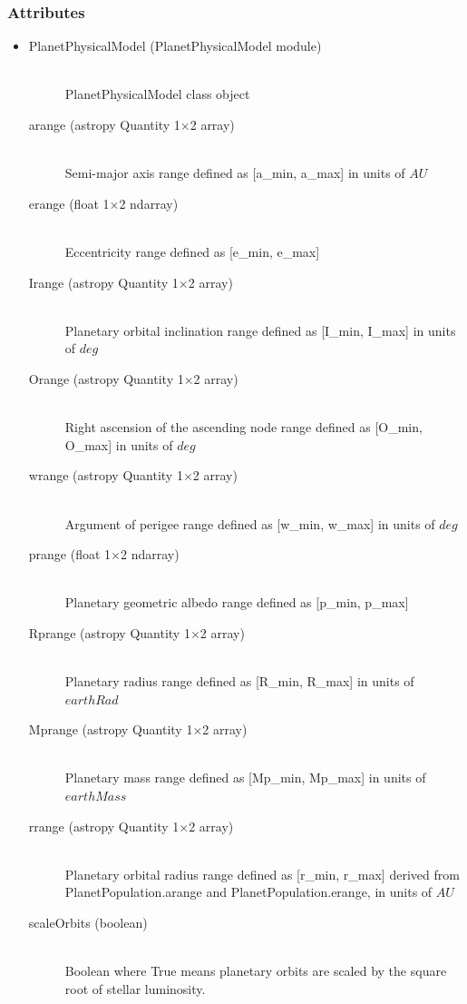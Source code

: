 \documentclass[cleanfoot]{asme2ej}
\begin{document}
\subsubsection*{Attributes}
\begin{itemize}
\item
\begin{description}
    \item[PlanetPhysicalModel (PlanetPhysicalModel module)] \hfill \\ PlanetPhysicalModel class object
    \item[arange (astropy Quantity 1$\times$2 array)] \hfill \\ Semi-major axis range defined as [a\_min, a\_max] in units of $ AU $
    \item[erange (float 1$\times$2 ndarray)] \hfill \\ Eccentricity range defined as [e\_min, e\_max]
    \item[Irange (astropy Quantity 1$\times$2 array)] \hfill \\ Planetary orbital inclination range defined as [I\_min, I\_max] in units of $ deg $
    \item[Orange (astropy Quantity 1$\times$2 array)] \hfill \\ Right ascension of the ascending node range defined as [O\_min, O\_max] in units of $ deg $
    \item[wrange (astropy Quantity 1$\times$2 array)] \hfill \\ Argument of perigee range defined as [w\_min, w\_max] in units of $ deg $
    \item[prange (float 1$\times$2 ndarray)] \hfill \\ Planetary geometric albedo range defined as [p\_min, p\_max]
    \item[Rprange (astropy Quantity 1$\times$2 array)] \hfill \\ Planetary radius range defined as [R\_min, R\_max] in units of $earthRad$
    \item[Mprange (astropy Quantity 1$\times$2 array)] \hfill \\ Planetary mass range defined as [Mp\_min, Mp\_max] in units of $earthMass$
    \item[rrange (astropy Quantity 1$\times$2 array)] \hfill \\ Planetary orbital radius range defined as [r\_min, r\_max] derived from PlanetPopulation.arange and PlanetPopulation.erange, in units of $ AU $
    \item [scaleOrbits (boolean)] \hfill \\ Boolean where True means planetary orbits are scaled by the square root of stellar luminosity.

\end{description}
\end{itemize}
\end{document}
